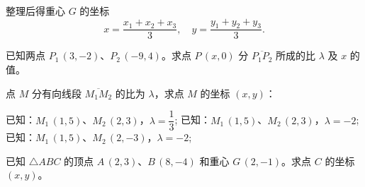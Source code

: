 \medskip\noindent
整理后得重心 \(G\) 的坐标
  \[ x=\frac{x_1+x_2+x_3}{3},\quad y=\frac{y_1+y_2+y_3}{3}.\]

\begin{Practice}
  \begin{question}
    \item 已知两点 $P_1\,(3,-2)$、$P_2\,(-9,4)$。求点 $P\,(x,0)$ 分 $\overline{P_1P_2}$ 所成的比 $\lambda$ 及 $x$ 的值。
    \item 点 $M$ 分有向线段 $\overline{M_1M_2}$ 的比为 $\lambda$，求点 $M$ 的坐标 $(x,y)$：
    \begin{tasks}
      \task 已知：$M_1\,(1,5)$、$M_2\,(2,3)$，$\lambda = \dfrac{1}{3}$;
      \task 已知：$M_1\,(1,5)$、$M_2\,(2,3)$，$\lambda = -2$;
      \task 已知：$M_1\,(1,5)$、$M_2\,(2,-3)$，$\lambda = -2$;
    \end{tasks}
    \item 已知 $\triangle ABC$ 的顶点 $A\,(2,3)$、$B\,(8,-4)$ 和重心 $G\,(2,-1)$。求点 $C$ 的坐标 $(x,y)$。
  \end{question}
\end{Practice}

